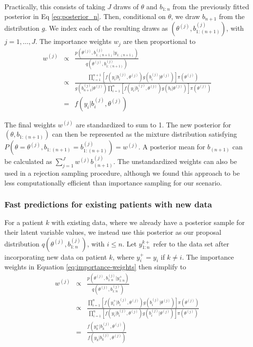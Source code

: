\documentclass[12pt, letterpaper]{article}
\begin{document}
Practically, this consists of taking $J$ draws of $\theta$ and $b_{1:n}$ from the previously fitted posterior in Eq \ref{eq:posterior_n}. Then, conditional on $\theta$, we draw $b_{n+1}$ from the distribution $g$. We index each of the resulting draws as $(\theta^{(j)},b_{1:(n+1)}^{(j)})$, with $j=1,\dots,J$. The importance weights $w_{j}$ are then proportional to 
\begin{eqnarray}
w^{(j)} & \propto & \frac{p(\theta^{(j)},b_{1:(n+1)}^{(j)}|y_{1:(n+1)})}{q(\theta^{(j)},b_{1:(n+1)}^{(j)})} \nonumber \\
 & \propto & \frac{\prod_{i=1}^{n+1}[f(y_{i}|b_{i}^{(j)},\theta^{(j)})g(b_{i}^{(j)}|\theta^{(j)})]\pi(\theta^{(j)})}{g(b_{n+1}^{(j)}|\theta^{(j)})\prod_{i=1}^{n}[f(y_{i}|b_{i}^{(j)},\theta^{(j)})g(b_{i}|\theta^{(j)})]\pi(\theta^{(j)})} \nonumber \\
\label{eq:importance-weights}
 & = & f(y_{i}|b_{i}^{(j)},\theta^{(j)})
\end{eqnarray}

The final weights $w^{(j)}$ are standardized to sum to 1. The new posterior for $(\theta,b_{1:(n+1)})$ can then be represented as the mixture distribution satisfying $P(\theta=\theta^{(j)},b_{1:(n+1)}=b_{1:(n+1)}^{(j)})=w^{(j)}$. A posterior mean for $b_{(n+1)}$ can be calculated as $\sum_{j=1}^{J}w^{(j)}b_{(n+1)}^{(j)}$. The unstandardized weights can also be used in a rejection sampling procedure, although we found this approach to be less computationally efficient than importance sampling for our scenario.


\subsubsection{Fast predictions for existing patients with new data}

For a patient $k$ with existing data, where we already have a posterior sample for their latent variable values, we instead use this posterior as our proposal distribution $q(\theta^{(j)},b_{1:n}^{(j)})$, with $i\leq n$. Let $y_{1:n}^{k+}$ refer to the data set after incorporating new data on patient $k$, where $y_{i}^{+}=y_{i}$ if $k\neq i$. The importance weights in Equation \ref{eq:importance-weights} then simplify to
\begin{eqnarray*}
w^{(j)} & \propto & \frac{p(\theta^{(j)},b_{1:n}^{(j)}|y_{1:n}^{+})}{q(\theta^{(j)},b_{1:n}^{(j)})}\\
 & \propto & \frac{\prod_{i=1}^{n}[f(\ensuremath{y_{i}^{+}}|b_{i}^{(j)},\theta^{(j)})g(b_{i}^{(j)}|\theta^{(j)})]\pi(\theta^{(j)})}{\prod_{i=1}^{n}[f(\ensuremath{ y_{i} }|b_{i}^{(j)},\theta^{(j)})g(b_{i}^{(j)}|\theta^{(j)})]\pi(\theta^{(j)})}\\
 & = & \frac{f(\ensuremath{ y_{k}^{+}} |b_{ k }^{(j)},\theta^{(j)})}{f(\ensuremath{ y_{k}} |b_{k}^{(j)},\theta^{(j)})}
\end{eqnarray*}
\end{document}
